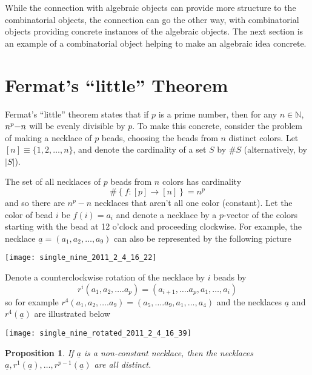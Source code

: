 \documentclass[english]{article}
\makeatletter
\newcommand{\lyxmathsym}[1]{\ifmmode\begingroup\def\b@ld{bold}
  \text{\ifx\math@version\b@ld\bfseries\fi#1}\endgroup\else#1\fi}
\newtheorem{proposition}[theorem]{Proposition}
\makeatother
\begin{document}
While the connection with algebraic objects can provide more structure
to the combinatorial objects, the connection can go the other way,
with combinatorial objects providing concrete instances of the algebraic
objects. The next section is an example of a combinatorial object
helping to make an algebraic idea concrete.


\section{Fermat's {}``little'' Theorem}

Fermat's {}``little'' theorem states that if $p$ is a prime number,
then for any $n\in\mathbb{N}$, $n^{p}\lyxmathsym{\textminus}n$ will
be evenly divisible by $p$. To make this concrete, consider the problem
of making a necklace of $p$ beads, choosing the beads from $n$ distinct
colors. Let $\left[n\right]\equiv\{1,2,\ldots,n\}$, and denote the
cardinality of a set $S$ by $\#S$ (alternatively, by $\left|S\right|$).

The set of all necklaces of $p$ beads from $n$ colors has cardinality\[
\#\left\{ f:\left[p\right]\rightarrow\left[n\right]\right\} =n^{p}\]
and so there are $n^{p}-n$ necklaces that aren't all one color (constant).
Let the color of bead $i$ be $f(i)=a_{i}$ and denote a necklace
by a $p$-vector of the colors starting with the bead at 12 o'clock
and proceeding clockwise. For example, the necklace $\underline{a}=(a_{1},a_{2},\ldots,a_{9})$
can also be represented by the following picture

\begin{center}
\texttt{[image: single\_nine\_2011\_2\_4\_16\_22]}
\par\end{center}

Denote a counterclockwise rotation of the necklace by $i$ beads by\[
r^{i}\left(a_{1},a_{2},\ldots.a_{p}\right)=\left(a_{i+1},\ldots.a_{p},a_{1},\ldots,a_{i}\right)\]
so for example $r^{4}\left(a_{1},a_{2},\ldots.a_{9}\right)=\left(a_{5},\ldots.a_{9},a_{1},\ldots,a_{4}\right)$
and the necklaces $\underline{a}$ and $r^{4}\left(\underline{a}\right)$
are illustrated below

\begin{center}
\texttt{[image: single\_nine\_rotated\_2011\_2\_4\_16\_39]}
\par\end{center}



\begin{proposition}

If $\underline{a}$ is a non-constant necklace, then the necklaces
$\underline{a},r^{1}\left(\underline{a}\right),\ldots,r^{p-1}\left(\underline{a}\right)$
are all distinct.

\end{proposition}
\end{document}
